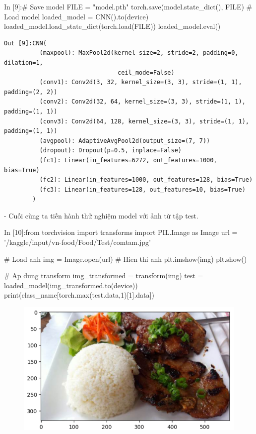 \documentclass[12pt, a4paper]{article}
\begin{document}
\begin{python}
In [9]:# Save model
        FILE = "model.pth"
        torch.save(model.state_dict(), FILE)
        # Load model
        loaded_model = CNN().to(device)
        loaded_model.load_state_dict(torch.load(FILE)) 
        loaded_model.eval()
\end{python}
\newpage
\begin{verbatim}
Out [9]:CNN(
          (maxpool): MaxPool2d(kernel_size=2, stride=2, padding=0, dilation=1, 
                                ceil_mode=False)
          (conv1): Conv2d(3, 32, kernel_size=(3, 3), stride=(1, 1), padding=(2, 2))
          (conv2): Conv2d(32, 64, kernel_size=(3, 3), stride=(1, 1), padding=(1, 1))
          (conv3): Conv2d(64, 128, kernel_size=(3, 3), stride=(1, 1), padding=(1, 1))
          (avgpool): AdaptiveAvgPool2d(output_size=(7, 7))
          (dropout): Dropout(p=0.5, inplace=False)
          (fc1): Linear(in_features=6272, out_features=1000, bias=True)
          (fc2): Linear(in_features=1000, out_features=128, bias=True)
          (fc3): Linear(in_features=128, out_features=10, bias=True)
        )    
\end{verbatim}
\par - Cuối cùng ta tiến hành thử nghiệm model với ảnh từ tập test.
\begin{python}
In [10]:from torchvision import transforms
        import PIL.Image as Image
        url = '/kaggle/input/vn-food/Food/Test/comtam.jpg'
        
        # Load anh
        img = Image.open(url)
        # Hien thi anh
        plt.imshow(img)
        plt.show()
        
        # Ap dung transform
        img_transformed = transform(img)
        test = loaded_model(img_transformed.to(device))
        print(class_name[torch.max(test.data,1)[1].data])
\end{python}
\begin{figure}[h] %
    \includegraphics[scale = 0.7]{Img/Dishes/P5.png}
\end{figure}
\end{document}
